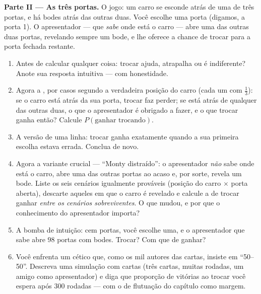 \begin{problem}
\medskip
\noindent\textbf{Parte II --- As três portas.}
O jogo: um carro se esconde atrás de uma de três portas, e há
bodes atrás das outras duas. Você escolhe uma porta (digamos, a
porta 1). O apresentador --- que \emph{sabe} onde está o carro ---
abre uma das outras duas portas, revelando sempre um bode, e lhe
oferece a chance de trocar para a porta fechada restante.
\begin{enumerate}[resume]
  \item Antes de calcular qualquer coisa: trocar ajuda, atrapalha
        ou é indiferente? Anote sua resposta intuitiva --- com
        honestidade.
  \item Agora a , por casos segundo a verdadeira posição do
        carro (cada um com $\frac13$): se o carro está atrás da
        sua porta, trocar faz perder; se está atrás de qualquer
        das outras duas, o que o apresentador é obrigado a fazer,
        e o que trocar ganha então? Calcule
        $P(\text{ganhar trocando})$.
  \item A versão de uma linha: trocar ganha exatamente quando a
        sua primeira escolha estava errada. Conclua de novo.
  \item Agora a variante crucial --- ``Monty distraído'': o
        apresentador \emph{não} sabe onde está o carro, abre uma
        das outras portas ao acaso e, por sorte, revela um bode.
        Liste os seis cenários igualmente prováveis (posição do
        carro $\times$ porta aberta), descarte aqueles em que o
        carro é revelado e calcule a  de trocar
        ganhar \emph{entre os cenários sobreviventes}. O que
        mudou, e por que o conhecimento do apresentador importa?
  \item A bomba de intuição: cem portas, você escolhe uma, e o
        apresentador que sabe abre $98$ portas com bodes. Trocar?
        Com que  de ganhar?
  \item Você enfrenta um cético que, como os mil autores das
        cartas, insiste em ``50--50''. Descreva uma simulação com
        cartas (três cartas, muitas rodadas, um amigo como
        apresentador) e diga que proporção de vitórias ao trocar
        você espera após $300$ rodadas --- com o  de
        flutuação do capítulo como margem.
\end{enumerate}


\end{problem}
